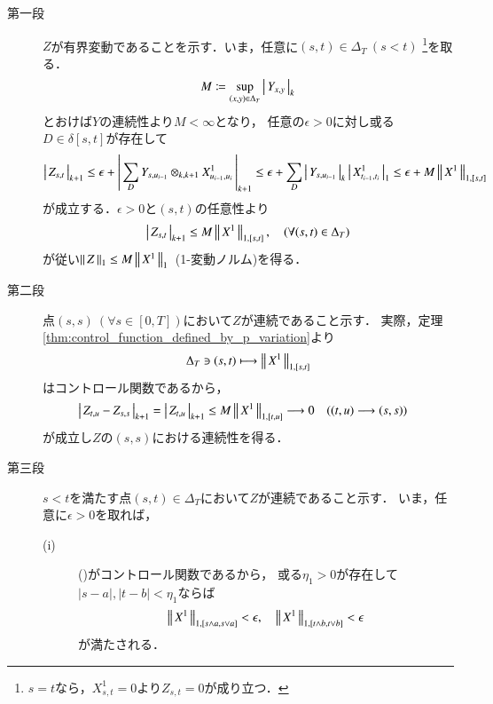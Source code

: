 	\begin{prf}\mbox{}
		\begin{description}
			\item[第一段]
				$Z$が有界変動であることを示す．いま，任意に$(s,t) \in \Delta_T\ (s < t)$
				\footnote{
					$s=t$なら，$X^1_{s,t} = 0$より$Z_{s,t} = 0$が成り立つ．
				}を取る．
				\begin{align}
					M \coloneqq \operatorname*{sup}_{(x,y) \in \Delta_T} \left|\, Y_{x,y}\, \right|_{k}
				\end{align}
				とおけば$Y$の連続性より$M < \infty$となり，
				任意の$\epsilon > 0$に対し或る$D \in \delta[s,t]$が存在して
				\begin{align}
					\left|\, Z_{s,t}\, \right|_{k+1}
					\leq \epsilon + \left|\, \sum_{D} Y_{s,u_{i-1}} \otimes_{k,k+1} X^1_{u_{i-1},u_i}\, \right|_{k+1}
					\leq \epsilon + \sum_D \left|\, Y_{s,u_{i-1}}\, \right|_{k}
					\left|\, X^1_{t_{i-1},t_i}\, \right|_{1} 
					\leq \epsilon + M \left\|\, X^1\, \right\|_{1,[s,t]}
				\end{align}
				が成立する．$\epsilon > 0$と$(s,t)$の任意性より
				\begin{align}
					\left|\, Z_{s,t}\, \right|_{k+1} \leq M \left\|\, X^1\, \right\|_{1,[s,t]},
					\quad (\forall (s,t) \in \Delta_T)
				\end{align}
				が従い$\left\|\, Z\, \right\|_{1} \leq M \left\|\, X^1\, \right\|_{1}$\ (1-変動ノルム)を得る．
				
			\item[第二段]
				点$(s,s)\ (\forall s \in [0,T])$において$Z$が連続であること示す．
				実際，定理\ref{thm:control_function_defined_by_p_variation}より
				\begin{align}
					\Delta_T \ni (s,t) \longmapsto \left\|\, X^1\, \right\|_{1,[s,t]}
					\label{map:lem_signature_of_path_1}
				\end{align}
				はコントロール関数であるから，
				\begin{align}
					&\left|\, Z_{t,u} - Z_{s,s}\, \right|_{k+1}
					= \left|\, Z_{t,u}\, \right|_{k+1}
					\leq M \left\|\, X^1\, \right\|_{1,[t,u]}
					\longrightarrow 0 \quad ((t,u) \longrightarrow (s,s))
				\end{align}
				が成立し$Z$の$(s,s)$における連続性を得る．
			
			\item[第三段]
				$s < t$を満たす点$(s,t) \in \Delta_T$において$Z$が連続であること示す．
				いま，任意に$\epsilon > 0$を取れば，
				\begin{description}
					\item[(i)] ()がコントロール関数であるから，
						或る$\eta_1 > 0$が存在して$|s-a|,|t-b| < \eta_1$ならば
						\begin{align}
							\left\|\, X^1\, \right\|_{1,[s \wedge a,s \vee a]} < \epsilon, 
							\quad \left\|\, X^1\, \right\|_{1,[t \wedge b,t \vee b]} < \epsilon
						\end{align}
						が満たされる．
						

\end{description}
\end{description}
\end{prf}
